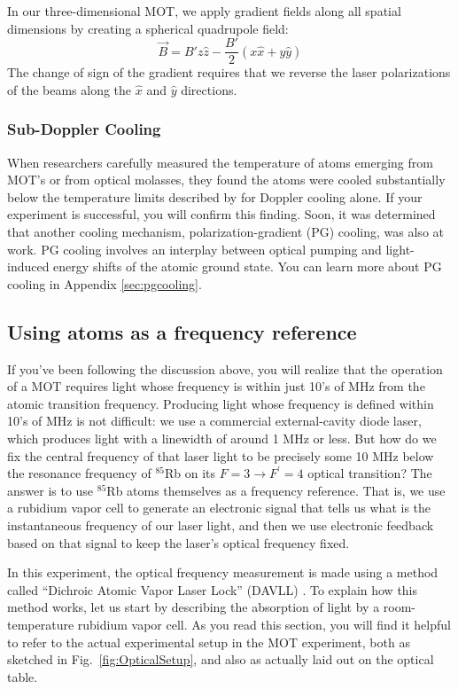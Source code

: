 \documentclass{../lab}
\begin{document}
In our three-dimensional MOT, we apply gradient fields along all spatial dimensions by creating a spherical quadrupole field:
\begin{equation}
    \vec{B} = B'z\hat{z} - \frac{B'}{2}(x\hat{x} + y\hat{y})
\end{equation}
The change of sign of the gradient requires that we reverse the laser polarizations of the beams along the $\hat{x}$ and $\hat{y}$ directions.

\subsubsection{Sub-Doppler Cooling}

When researchers carefully measured the temperature of atoms emerging from MOT’s or from optical molasses, they found the atoms were cooled substantially below the temperature limits described by  for Doppler cooling alone. If your experiment is successful, you will confirm this finding.  Soon, it was determined that another cooling mechanism, polarization-gradient (PG) cooling, was also at work. PG cooling involves an interplay between optical pumping and light-induced energy shifts of the atomic ground state.  You can learn more about PG cooling in  Appendix \ref{sec:pgcooling}.


\subsection{Using atoms as a frequency reference}

If you've been following the discussion above, you will realize that the operation of a MOT requires light whose frequency is within just 10's of MHz from the atomic transition frequency.  Producing light whose frequency is defined within 10's of MHz is not difficult: we use a commercial external-cavity diode laser, which produces light with a linewidth of around 1 MHz or less.  But how do we fix the central frequency of that laser light to be precisely some 10 MHz below the resonance frequency of $^{85}$Rb on its $F=3 \rightarrow F^\prime = 4$ optical transition?  The answer is to use $^{85}$Rb atoms themselves as a frequency reference.  That is, we use a rubidium vapor cell to generate an electronic signal that tells us what is the instantaneous frequency of our laser light, and then we use electronic feedback based on that signal to keep the laser's optical frequency fixed.

In this experiment, the optical frequency measurement is made using a method called ``Dichroic Atomic Vapor Laser Lock'' (DAVLL) \cite{Corwin}.  To explain how this method works, let us start by describing the absorption of light by a room-temperature rubidium vapor cell.  As you read this section, you will find it helpful to refer to the actual experimental setup in the MOT experiment, both as sketched in Fig.\ \ref{fig:OpticalSetup}, and also as actually laid out on the optical table.
\end{document}
